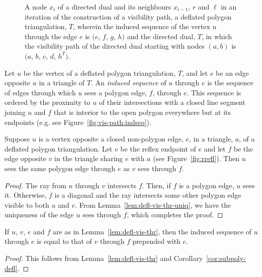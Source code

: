 \documentclass{amsart}
\begin{document}
\begin{figure}[htb]
  \centering
   \quad
   \quad
  \caption{\protect{} A node $x_i$ of a
    directed dual and its neighbours $x_{i-1}$, $r$ and $\ell$ in an
    iteration of the construction of a visibility
    path, \protect{} a deflated polygon
    triangulation, $T$, wherein the induced sequence of the vertex $u$
    through the edge $e$ is $(e$, $f$, $g$, $h)$
    and \protect{} the directed dual, $T$, in
    which the visibility path of the directed dual starting with nodes
    $(a,b)$ is $(a$, $b$, $c$, $d$, $h^T)$.}
  \label{fig:vis-path}
\end{figure}

Let $u$ be the vertex of a deflated polygon triangulation, $T$, and
let $e$ be an edge opposite $u$ in a triangle of $T$.
An \emph{induced sequence} of $u$ through $e$ is the sequence of edges
through which $u$ sees a polygon edge, $f$, through $e$.  This
sequence is ordered by the proximity to $u$ of their intersections
with a closed line segment joining $u$ and $f$ that is interior to the
open polygon everywhere but at its endpoints (e.g. see
Figure~\ref{fig:vis-path:indseq}).

\begin{lemma}
  \label{lem:defl-vis-thr}
  Suppose $u$ is a vertex opposite a closed non-polygon edge, $e$, in
  a triangle, $a$, of a deflated polygon triangulation.  Let $v$ be
  the reflex endpoint of $e$ and let $f$ be the edge opposite $v$ in
  the triangle sharing $e$ with $a$ (see Figure~\ref{fig:rrefl}).
  Then $u$ sees the same polygon edge through $e$ as $v$ sees through
  $f$.
\end{lemma}
\iffullversion
\begin{proof}
  The ray from $u$ through $v$ intersects $f$.  Then, if $f$ is a
  polygon edge, $u$ sees it.  Otherwise, $f$ is a diagonal and the ray
  intersects some other polygon edge visible to both $u$ and $v$.
  From Lemma~\ref{lem:defl-vis-thr-uniq}, we have the uniqueness of
  the edge $u$ sees through $f$, which completes the proof.
\end{proof}
\fi

\begin{cor}
  \label{cor:ind-path-rec}
  If $u$, $v$, $e$ and $f$ are as in Lemma~\ref{lem:defl-vis-thr},
  then the induced sequence of $u$ through $e$ is equal to that of $v$
  through $f$ prepended with $e$.
\end{cor}
\iffullversion
\begin{proof}
  This follows from Lemma~\ref{lem:defl-vis-thr} and
  Corollary~\ref{cor:subpoly-defl}.
\end{proof}
\fi
\end{document}
